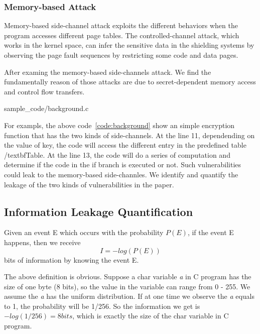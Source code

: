 \subsubsection{Memory-based Attack}
Memory-based side-channel attack\cite{} exploits the different behaviors when the
program accesses different page tables. The controlled-channel attack\cite{7163052},
which works in the kernel space, can infer the sensitive data in the shielding systems by
observing the page fault sequences by restricting some code and
data pages. 

After examing the memory-based side-channels attack. We find the fundamentally
reason of those attacks are due to secret-dependent memory access and control
flow transfers.

                 {sample_code/background.c}

For exampls, the above code~\ref{code:background} show an simple encryption function that
has the two kinds of side-channels. At the line 11, dependending on the value of key,
the code will access the different entry in the predefined table /textbf{Table}. At the
line 13, the code will do a series of computation and determine if the code in the if
branch is executed or not. Such vulnerabilities could leak to the memory-based 
side-channles. We identify and quantify the leakage of the two kinds of vulnerabilities 
in the paper.

\subsection{Information Leakage Quantification}
Given an event E which occurs with the probability $P(E)$, if the event E happens, 
then we receive
\begin{equation}
    I = - log(P(E))
\end{equation}
bits of information by knowing the event E.

The above definition is obvious. Suppose a char variable \textit{a} in C program has the size
of one byte (8 bits), so the value in the variable can range from 0 - 255. We assume
the \textit{a} has the uniform distribution. If at one time we observe the \textit{a}
equals to 1, the probability will be 1/256. So the information we get is 
$-log(1/256) = 8 bits$, which is exactly the size of the char variable in C program.

